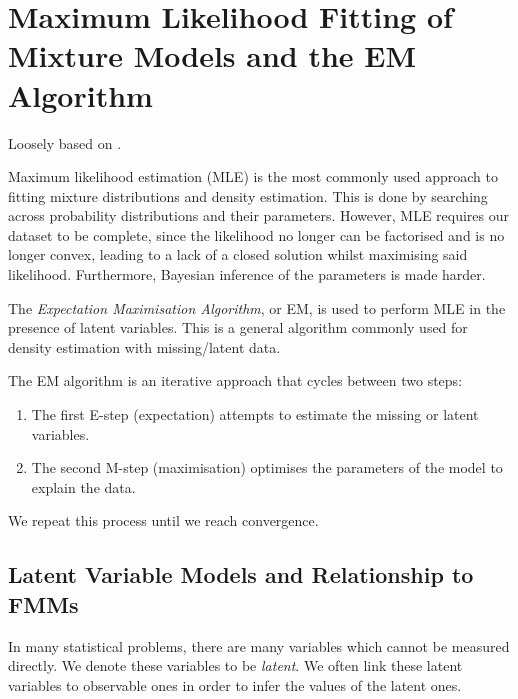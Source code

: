 \documentclass{article}\usepackage[]{graphicx}\usepackage[]{xcolor}
\theoremstyle{plain}
\theoremstyle{definition}
\theoremstyle{remark}
\begin{document}
\newpage



\section{Maximum Likelihood Fitting of Mixture Models and the EM Algorithm}\label{sec:EM}
Loosely based on \cite{EM_Info}.

Maximum likelihood estimation (MLE) is the most commonly used approach to fitting mixture distributions and density estimation. This is done by searching across probability distributions and their parameters. However, MLE requires our dataset to be complete, since the likelihood no longer can be factorised and is no longer convex, leading to a lack of a closed solution whilst maximising said likelihood. Furthermore, Bayesian inference of the parameters is made harder.

The \textit{Expectation Maximisation Algorithm}, or EM, is used to perform MLE in the presence of latent variables. This is a general algorithm commonly used for density estimation with missing/latent data.

The EM algorithm is an iterative approach that cycles between two steps:
\begin{enumerate}
    \item The first E-step (expectation) attempts to estimate the missing or latent variables.
    \item The second M-step (maximisation) optimises the parameters of the model to explain the data.
\end{enumerate}
We repeat this process until we reach convergence.

\subsection{Latent Variable Models and Relationship to FMMs}

In many statistical problems, there are many variables which cannot be measured directly. We denote these variables to be \textit{latent}. We often link these latent variables to observable ones in order to infer the values of the latent ones.
\end{document}

